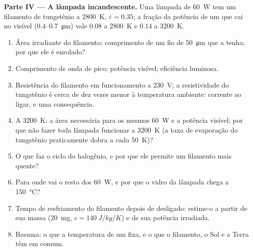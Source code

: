 \begin{problem}
\textbf{Parte IV --- A lâmpada incandescente.}
Uma lâmpada de \qty{60}{W} tem um filamento de tungstênio a \qty{2800}{K},
$\varepsilon = 0.35$; a fração da potência de um  que cai
no visível ($0.4$--\qty{0.7}{\micro m}) vale $0.08$ a \qty{2800}{K} e $0.14$
a \qty{3200}{K}.
\begin{enumerate}[resume]
  \item Área irradiante do filamento; comprimento de um fio de \qty{50}{\micro m}
        que a tenha; por que ele é enrolado?
  \item Comprimento de onda de pico; potência visível; eficiência luminosa.
  \item Resistência do filamento em funcionamento a \qty{230}{V}; a
        resistividade do tungstênio é cerca de dez vezes menor à temperatura
        ambiente: corrente ao ligar, e uma consequência.
  \item A \qty{3200}{K}: a área necessária para os mesmos \qty{60}{W} e
        a potência visível; por que não fazer toda lâmpada funcionar a \qty{3200}{K}
        (a taxa de evaporação do tungstênio praticamente dobra a cada
        \qty{50}{K})?
  \item O que faz o ciclo do halogênio, e por que ele permite um filamento
        mais quente?
  \item Para onde vai o resto dos \qty{60}{W}, e por que o vidro da
        lâmpada chega a \qty{150}{\celsius}?
  \item Tempo de resfriamento do filamento depois de desligado: estime-o a partir
        de sua massa (\qty{20}{mg}, $c = \qty{140}{J/kg/K}$) e de sua potência
        irradiada.
  \item Resuma: o que a temperatura de um  fixa, e o que
        o filamento, o Sol e a Terra têm em comum.
\end{enumerate}
\end{problem}
